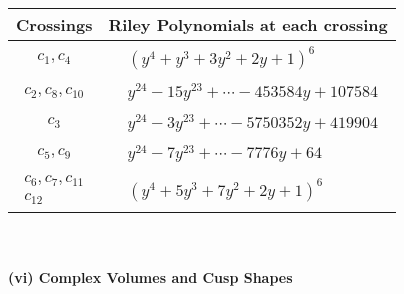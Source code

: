 \documentclass[1p]{elsarticle_modified}
\theoremstyle{definition}
\begin{document}
\begin{tabular}{m{50pt}|m{274pt}}
Crossings & \hspace{64pt}Riley Polynomials at each crossing \\
\hline $$\begin{aligned}c_{1},c_{4}\end{aligned}$$&$\begin{aligned}
&(y^4+y^3+3 y^2+2 y+1)^6
\end{aligned}$\\
\hline $$\begin{aligned}c_{2},c_{8},c_{10}\end{aligned}$$&$\begin{aligned}
&y^{24}-15 y^{23}+\cdots-453584 y+107584
\end{aligned}$\\
\hline $$\begin{aligned}c_{3}\end{aligned}$$&$\begin{aligned}
&y^{24}-3 y^{23}+\cdots-5750352 y+419904
\end{aligned}$\\
\hline $$\begin{aligned}c_{5},c_{9}\end{aligned}$$&$\begin{aligned}
&y^{24}-7 y^{23}+\cdots-7776 y+64
\end{aligned}$\\
\hline $$\begin{aligned}c_{6},c_{7},c_{11}\\c_{12}\end{aligned}$$&$\begin{aligned}
&(y^4+5 y^3+7 y^2+2 y+1)^6
\end{aligned}$\\
\hline
\end{tabular}\\~\\
\newpage\flushleft \textbf{(vi) Complex Volumes and Cusp Shapes}
\end{document}
